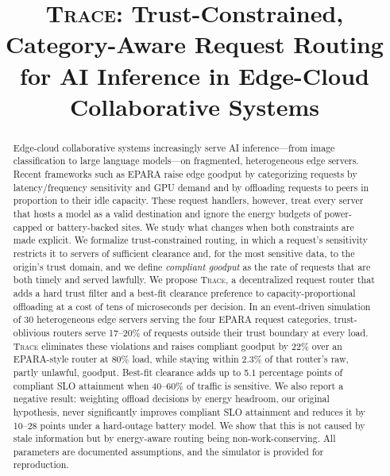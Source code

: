 \documentclass[journal]{IEEEtran}
\newcommand{\sys}{\textsc{Trace}}
\begin{document}
\title{\sys: Trust-Constrained, Category-Aware Request Routing for AI Inference in Edge-Cloud Collaborative Systems}

\author{\IEEEauthorblockN{}
\IEEEauthorblockA{}}

\markboth{}{}
\maketitle

\begin{abstract}
Edge-cloud collaborative systems increasingly serve AI inference---from image classification to large language models---on fragmented, heterogeneous edge servers. Recent frameworks such as EPARA raise edge goodput by categorizing requests by latency/frequency sensitivity and GPU demand and by offloading requests to peers in proportion to their idle capacity. These request handlers, however, treat every server that hosts a model as a valid destination and ignore the energy budgets of power-capped or battery-backed sites. We study what changes when both constraints are made explicit. We formalize trust-constrained routing, in which a request's sensitivity restricts it to servers of sufficient clearance and, for the most sensitive data, to the origin's trust domain, and we define \emph{compliant goodput} as the rate of requests that are both timely and served lawfully. We propose \sys{}, a decentralized request router that adds a hard trust filter and a best-fit clearance preference to capacity-proportional offloading at a cost of tens of microseconds per decision. In an event-driven simulation of 30 heterogeneous edge servers serving the four EPARA request categories, trust-oblivious routers serve 17--20\% of requests outside their trust boundary at every load. \sys{} eliminates these violations and raises compliant goodput by 22\% over an EPARA-style router at 80\% load, while staying within 2.3\% of that router's raw, partly unlawful, goodput. Best-fit clearance adds up to 5.1 percentage points of compliant SLO attainment when 40--60\% of traffic is sensitive. We also report a negative result: weighting offload decisions by energy headroom, our original hypothesis, never significantly improves compliant SLO attainment and reduces it by 10--28 points under a hard-outage battery model. We show that this is not caused by stale information but by energy-aware routing being non-work-conserving. All parameters are documented assumptions, and the simulator is provided for reproduction.
\end{abstract}
\end{document}

